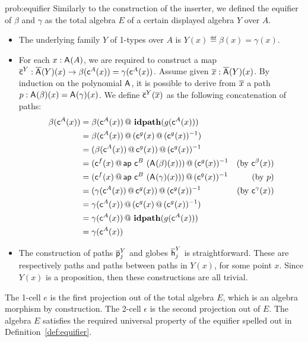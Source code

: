\begin{construction}{prob:equifier}\label{cons:equifier}
Similarly to the construction of the inserter, we defined the equifier
of $\beta$ and $\gamma$ as the total algebra $E$ of a certain
displayed algebra $Y$ over $A$.
\begin{itemize}
\item The underlying family $Y$ of 1-types over $A$ is $Y(x) \eqdef \beta(x) = \gamma(x)$.
\item
For each $x : \mathsf{A}^{}(A)$, we are required to construct
a map $\overline{\mathsf{c}}^{Y} : \overline{\mathsf{A}^{}}(Y)(x) \rightarrow
\beta(\mathsf{c}^{A}(x)) = \gamma (\mathsf{c}^{A}(x))$. Assume given $\overline{x}
: \overline{\mathsf{A}^{}}(Y)(x)$. By induction on the polynomial
$\mathsf{A}^{}$, it is possible to derive from $\overline{x}$ a path $p
: \mathsf{A}^{}(\beta)(x) = \mathsf{A}^{}(\gamma)(x)$.  We
define $\overline{\mathsf{c}}^{Y}(\overline{x})$ as the following concatenation of
paths:
\begin{align*}
\beta(\mathsf{c}^{A}(x))
&= \beta(\mathsf{c}^{A}(x)) \, @ \, \operatorname{\mathbf{idpath}}(g(\mathsf{c}^{A}(x))) \\
&= \beta(\mathsf{c}^{A}(x)) \, @ \, (\mathsf{c}^{g}(x) \, @ \, (\mathsf{c}^{g}(x))^{-1}) \\
&= (\beta(\mathsf{c}^{A}(x)) \, @ \, \mathsf{c}^{g}(x)) \, @ \, (\mathsf{c}^{g}(x))^{-1} \\
&= (\mathsf{c}^{f}(x) \, @ \, \mathsf{ap} \ \mathsf{c}^{B} \ (\mathsf{A}^{}(\beta)(x))) \, @ \, (\mathsf{c}^{g}(x))^{-1}
& \text{(by $\mathsf{c}^{\beta}(x)$)}\\
&= (\mathsf{c}^{f}(x) \, @ \, \mathsf{ap} \ \mathsf{c}^{B} \ (\mathsf{A}^{}(\gamma)(x))) \, @ \, (\mathsf{c}^{g}(x))^{-1}
& \text{(by $p$)}\\
&= (\gamma(\mathsf{c}^{A}(x)) \, @ \, \mathsf{c}^{g}(x)) \, @ \, (\mathsf{c}^{g}(x))^{-1}
& \text{(by $\mathsf{c}^{\gamma}(x)$)}\\
&= \gamma(\mathsf{c}^{A}(x)) \, @ \, (\mathsf{c}^{g}(x) \, @ \, (\mathsf{c}^{g}(x))^{-1}) \\
&= \gamma(\mathsf{c}^{A}(x)) \, @ \, \operatorname{\mathbf{idpath}}(g(\mathsf{c}^{A}(x))) \\
&= \gamma(\mathsf{c}^{A}(x))
\end{align*}
\item The construction of paths $\overline{\mathsf{p}}^{Y}_{j}$ and globes $\overline{\mathsf{h}}^{Y}_{j}$ is
straightforward. These are respectively paths and paths between paths
in $Y(x)$, for some point $x$. Since $Y(x)$ is a proposition, then
these constructions are all trivial.
\end{itemize}

The 1-cell $e$ is the first projection out of the total algebra $E$, which
is an algebra morphism by construction. The 2-cell $\epsilon$ is the
second projection out of $E$. The algebra $E$ satisfies the required
universal property of the equifier spelled out in Definition~\ref{def:equifier}.

\end{construction}
